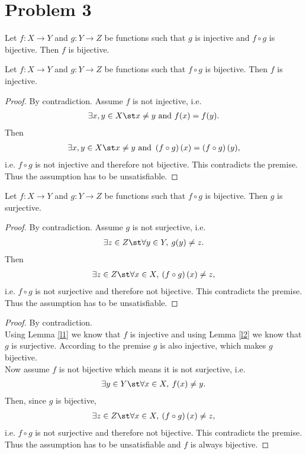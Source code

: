 \documentclass{article}
\begin{document}
\section*{Problem 3}
\begin{claim}
	Let $f:X\to Y$ and $g:Y\to Z$ be functions such that $g$ is injective and $f\circ g$ is bijective. Then $f$ is bijective.
\end{claim}
\begin{adjustwidth}{2em}{0pt}
	\begin{lemma}
		\label{l1}
		Let $f:X\to Y$ and $g:Y\to Z$ be functions such that $f\circ g$ is bijective. Then $f$ is injective.
	\end{lemma}
	\begin{proof}
		By contradiction. Assume $f$ is not injective, i.e.
		\begin{align*}
			\exists x,y \in X \st x \not= y \text{ and } f(x) = f(y).
		\end{align*}
		Then
		\begin{align*}
			\exists x,y \in X \st x \not= y \text{ and } \left(f\circ g\right)(x) = \left(f\circ g\right)(y),
		\end{align*}
		i.e. $f\circ g$ is not injective and therefore not bijective.
		This contradicts the premise.
		Thus the assumption has to be unsatisfiable.
	\end{proof}
	\begin{lemma}
		\label{l2}
		Let $f:X\to Y$ and $g:Y\to Z$ be functions such that $f\circ g$ is bijective. Then $g$ is surjective.
	\end{lemma}
	\begin{proof}
		By contradiction. Assume $g$ is not surjective, i.e.
		\begin{align*}
			\exists z \in Z \st \forall y \in Y,\:g(y) \not= z.
		\end{align*}
		Then
		\begin{align*}
			\exists z \in Z \st \forall x \in X,\: \left(f\circ g\right)(x) \not= z,
		\end{align*}
		i.e. $f\circ g$ is not surjective and therefore not bijective.
		This contradicts the premise.
		Thus the assumption has to be unsatisfiable.
	\end{proof}
\end{adjustwidth}
\begin{proof}
	By contradiction.\\
	Using Lemma \ref{l1} we know that $f$ is injective and using Lemma \ref{l2} we know that $g$ is surjective.
	According to the premise $g$ is also injective, which makes $g$ bijective.\\
	Now assume $f$ is not bijective which means it is not surjective, i.e.
	\begin{align}
		\label{eq1}
		\exists y \in Y \st \forall x \in X,\: f(x)\not= y.
	\end{align}
	Then, since $g$ is bijective,
	\begin{align}
		\label{eq2}
		\exists z \in Z \st \forall x \in X,\: \left(f\circ g\right)(x)\not= z,
	\end{align}
	i.e. $f\circ g$ is not surjective and therefore not bijective.
	This contradicts the premise.
	Thus the assumption has to be unsatisfiable and $f$ is always bijective.
\end{proof}
\end{document}
